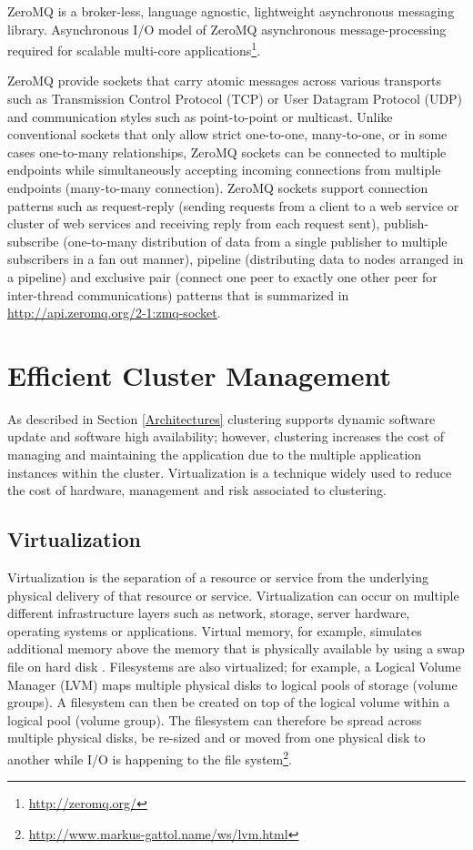 \documentclass[a4paper,11pt,twoside]{report}
\begin{document}
ZeroMQ is a broker-less, language agnostic, lightweight asynchronous messaging library. Asynchronous I/O model of ZeroMQ asynchronous message-processing required for scalable multi-core applications\footnote{\label{ZeroMQ_2} \url{http://zeromq.org/}}. 

ZeroMQ provide sockets that carry atomic messages across various transports such as Transmission Control Protocol (TCP) or User Datagram Protocol (UDP) and communication styles such as point-to-point or multicast. Unlike conventional sockets that only allow strict one-to-one, many-to-one, or in some cases one-to-many relationships, ZeroMQ sockets can be connected to multiple endpoints while simultaneously accepting incoming connections from multiple endpoints (many-to-many connection). ZeroMQ sockets support connection patterns such as request-reply (sending requests from a client to a web service or cluster of web services and receiving reply from each request sent), publish-subscribe (one-to-many distribution of data from a single publisher to multiple subscribers in a fan out manner), pipeline (distributing data to nodes arranged in a pipeline) and exclusive pair (connect one peer to exactly one other peer for inter-thread communications) patterns that is summarized in \url{http://api.zeromq.org/2-1:zmq-socket}.      


\section{Efficient Cluster Management} 
As described in Section \ref{Architectures} clustering supports dynamic software update and software high availability; however, clustering increases the cost of managing and maintaining the application due to the multiple application instances within the cluster. Virtualization is a technique widely used to reduce the cost of hardware, management and risk associated to clustering.

\subsection{Virtualization} 
Virtualization is the separation of a resource or service from the underlying physical delivery of that resource or service. Virtualization can occur on multiple different infrastructure layers such as network, storage, server hardware, operating systems or applications. Virtual memory, for example, simulates additional memory above the memory that is physically available by using a swap file on hard disk \cite{virtualization}. Filesystems are also virtualized; for example, a Logical Volume Manager (LVM) maps multiple physical disks to logical pools of storage (volume groups). A filesystem can then be created on top of the logical volume within a logical pool (volume group). The filesystem can therefore be spread across multiple physical disks, be re-sized and or moved from one physical disk to another while I/O is happening to the file system\footnote{ \url {http://www.markus-gattol.name/ws/lvm.html}}. 
\end{document}
